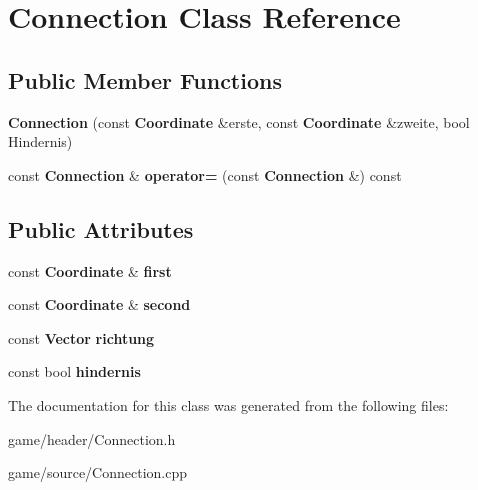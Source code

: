 \section{Connection Class Reference}
\label{class_connection}
\subsection*{Public Member Functions}
\begin{DoxyCompactItemize}
\item 
{\bfseries Connection} (const {\bf Coordinate} \&erste, const {\bf Coordinate} \&zweite, bool Hindernis)\label{class_connection_acff2b5b881817a7b6e8d8173a1937640}

\item 
const {\bf Connection} \& {\bfseries operator=} (const {\bf Connection} \&) const \label{class_connection_a715ee5805776e50b971d5772267e4b46}

\end{DoxyCompactItemize}
\subsection*{Public Attributes}
\begin{DoxyCompactItemize}
\item 
const {\bf Coordinate} \& {\bfseries first}\label{class_connection_a1e4300e2849a2daebf4b1e4577ef1ea8}

\item 
const {\bf Coordinate} \& {\bfseries second}\label{class_connection_a968eaf3cec0996491425d8569e42416f}

\item 
const {\bf Vector} {\bfseries richtung}\label{class_connection_a34f34fdc3e693d504ad9d108c2e7ea02}

\item 
const bool {\bfseries hindernis}\label{class_connection_ae29f9a099c5d00919eb45123864fb7f4}

\end{DoxyCompactItemize}


The documentation for this class was generated from the following files\-:\begin{DoxyCompactItemize}
\item 
game/header/Connection.\-h\item 
game/source/Connection.\-cpp\end{DoxyCompactItemize}
